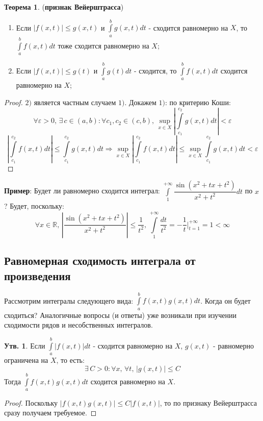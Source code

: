 \documentclass[12pt]{article}
\newcommand{\MR}{\mathbb{R}}
\newcommand{\VE}{\varepsilon}
\theoremstyle{definition}
\newtheorem{prop}{Утв.}
\newtheorem{theorem}{Теорема}
\newcommand{\ddint}[2]{\displaystyle\int\limits_{#1}^{#2}}
\begin{document}
\begin{theorem}(\textbf{признак Вейерштрасса})
	\begin{enumerate}[label=\arabic*)]
		\item Если $|f(x,t)| \leq g(x,t)$ и $\ddint{a}{b}g(x,t)dt$ - сходится равномерно на $X$, то $\ddint{a}{b}f(x,t)dt$ тоже сходится равномерно на $X$;
		\item Если $|f(x,t)| \leq g(t)$ и $\ddint{a}{b}g(t)dt$ - сходится, то $\ddint{a}{b}f(x,t)dt$ сходится равномерно на $X$;
	\end{enumerate}
\end{theorem}
\begin{proof}
	$2)$ является частным случаем $1)$. Докажем $1)$: по критерию Коши:
	$$
		\forall \VE > 0, \, \exists \, c \in (a,b) \colon \forall c_1, c_2 \in (c,b), \, \sup\limits_{x \in X} \left|\ddint{c_1}{c_2}g(x,t)dt\right| < \VE
	$$
	$$
		\left| \ddint{c_1}{c_2}f(x,t)dt \right| \leq \ddint{c_1}{c_2}g(x,t)dt \Rightarrow \sup\limits_{x \in X}\left| \ddint{c_1}{c_2}f(x,t)dt \right| \leq \sup\limits_{x \in X}\ddint{c_1}{c_2}g(x,t)dt < \VE
	$$
\end{proof}

\textbf{Пример}: Будет ли равномерно сходится интеграл: $\ddint{1}{+\infty}\dfrac{\sin{(x^2 + tx + t^2)}}{x^2 + t^2} dt$ по $x$ ? Будет, поскольку:
$$
	\forall x \in \MR, \, \left|\dfrac{\sin{(x^2 + tx + t^2)}}{x^2 + t^2} \right| \leq \dfrac{1}{t^2},\, \ddint{1}{+\infty}\dfrac{dt}{t^2} = -\dfrac{1}{t}\Big|_{t = 1}^{+\infty} = 1 < \infty
$$

\newpage
\subsection*{Равномерная сходимость интеграла от произведения}
Рассмотрим интегралы следующего вида: $\ddint{a}{b}f(x,t)g(x,t)dt$. Когда он будет сходиться?
Аналогичные вопросы (и ответы) уже возникали при изучении сходимости рядов и несобственных интегралов.
\begin{prop}
	Если $\ddint{a}{b}|f(x,t)|dt$ - сходится равномерно на $X$, $g(x,t)$ - равномерно ограничена на $X$, то есть: 
	$$
		\exists \, C > 0 \colon \forall x, \, \forall t, \, |g(x,t)| \leq C
	$$
	Тогда $\ddint{a}{b}f(x,t)g(x,t)dt$ сходится равномерно на $X$.
\end{prop}
\begin{proof}
	Поскольку $|f(x,t)g(x,t)| \leq C |f(x,t)|$, то по признаку Вейерштрасса сразу получаем требуемое.
\end{proof}
\end{document}
